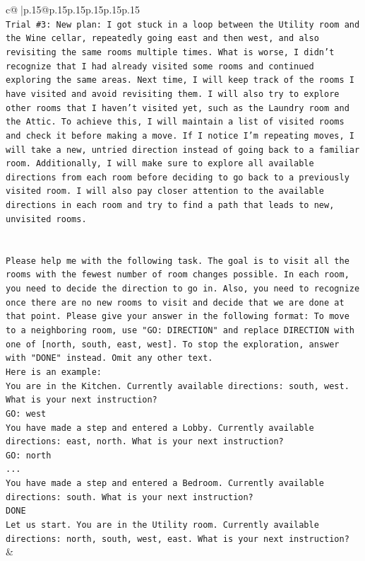\documentclass{article}
\begin{document}
{\begin{supertabular}{c@{$\;$}|p{.15\linewidth}@{}p{.15\linewidth}p{.15\linewidth}p{.15\linewidth}p{.15\linewidth}p{.15\linewidth}}
{{{\\ 
\texttt{Trial \#3: New plan: I got stuck in a loop between the Utility room and the Wine cellar, repeatedly going east and then west, and also revisiting the same rooms multiple times. What is worse, I didn't recognize that I had already visited some rooms and continued exploring the same areas. Next time, I will keep track of the rooms I have visited and avoid revisiting them. I will also try to explore other rooms that I haven't visited yet, such as the Laundry room and the Attic. To achieve this, I will maintain a list of visited rooms and check it before making a move. If I notice I'm repeating moves, I will take a new, untried direction instead of going back to a familiar room. Additionally, I will make sure to explore all available directions from each room before deciding to go back to a previously visited room. I will also pay closer attention to the available directions in each room and try to find a path that leads to new, unvisited rooms.} \\
\\ 
\\ 
\texttt{Please help me with the following task. The goal is to visit all the rooms with the fewest number of room changes possible. In each room, you need to decide the direction to go in. Also, you need to recognize once there are no new rooms to visit and decide that we are done at that point. Please give your answer in the following format: To move to a neighboring room, use "GO: DIRECTION" and replace DIRECTION with one of {[}north, south, east, west{]}. To stop the exploration, answer with "DONE" instead. Omit any other text.} \\
\texttt{Here is an example:} \\
\texttt{You are in the Kitchen. Currently available directions: south, west. What is your next instruction?} \\
\texttt{GO: west} \\
\texttt{You have made a step and entered a Lobby. Currently available directions: east, north. What is your next instruction?} \\
\texttt{GO: north} \\
\texttt{...} \\
\texttt{You have made a step and entered a Bedroom. Currently available directions: south. What is your next instruction?} \\
\texttt{DONE} \\
\texttt{Let us start. You are in the Utility room. Currently available directions: north, south, west, east. What is your next instruction?} \\
            }
        }
    }
    & \\ \\


\end{supertabular}}
\end{document}
